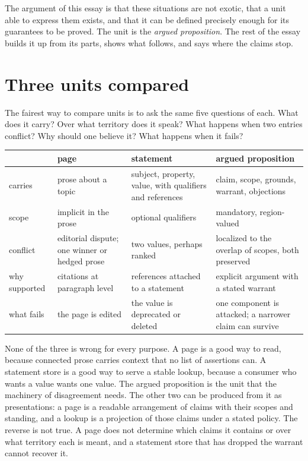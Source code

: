 \documentclass[11pt]{article}
\begin{document}
The argument of this essay is that these situations are not exotic, that a unit able to express them exists, and that it can be defined precisely enough for its guarantees to be proved. The unit is the \emph{argued proposition}. The rest of the essay builds it up from its parts, shows what follows, and says where the claims stop.

\section{Three units compared}\label{sec:three}

The fairest way to compare units is to ask the same five questions of each. What does it carry? Over what territory does it speak? What happens when two entries conflict? Why should one believe it? What happens when it fails?

\begin{center}
\small
\begin{tabularx}{\textwidth}{@{}l X X X@{}}
\toprule
 & page & statement & argued proposition\\
\midrule
carries & prose about a topic & subject, property, value, with qualifiers and references & claim, scope, grounds, warrant, objections\\
scope & implicit in the prose & optional qualifiers & mandatory, region-valued\\
conflict & editorial dispute; one winner or hedged prose & two values, perhaps ranked & localized to the overlap of scopes, both preserved\\
why supported & citations at paragraph level & references attached to a statement & explicit argument with a stated warrant\\
what fails & the page is edited & the value is deprecated or deleted & one component is attacked; a narrower claim can survive\\
\bottomrule
\end{tabularx}
\end{center}

None of the three is wrong for every purpose. A page is a good way to read, because connected prose carries context that no list of assertions can. A statement store is a good way to serve a stable lookup, because a consumer who wants a value wants one value. The argued proposition is the unit that the machinery of disagreement needs. The other two can be produced from it as presentations: a page is a readable arrangement of claims with their scopes and standing, and a lookup is a projection of those claims under a stated policy. The reverse is not true. A page does not determine which claims it contains or over what territory each is meant, and a statement store that has dropped the warrant cannot recover it.
\end{document}
